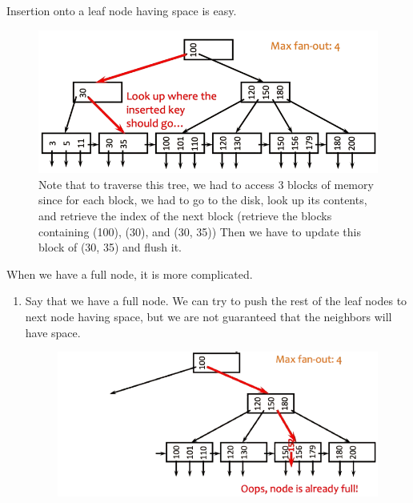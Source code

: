     \begin{algo}[Insertion]
      Insertion onto a leaf node having space is easy. 
      
      \begin{figure}[H]
        \centering 
        \includegraphics[scale=0.4]{img/insertion_easy.png}
        \caption{Note that to traverse this tree, we had to access 3 blocks of memory since for each block, we had to go to the disk, look up its contents, and retrieve the index of the next block (retrieve the blocks containing (100), (30), and (30, 35)) Then we have to update this block of (30, 35) and flush it. }
        \label{fig:insertion_easy}
      \end{figure}

      When we have a full node, it is more complicated. 
      \begin{enumerate}
        \item Say that we have a full node. We can try to push the rest of the leaf nodes to next node having space, but we are not guaranteed that the neighbors will have space. 

        \begin{figure}[H]
          \centering 
          \includegraphics[scale=0.4]{img/insertion_1.png}
          \caption{} 
          \label{fig:insertion_1}
        \end{figure}


\end{enumerate}
\end{algo}
